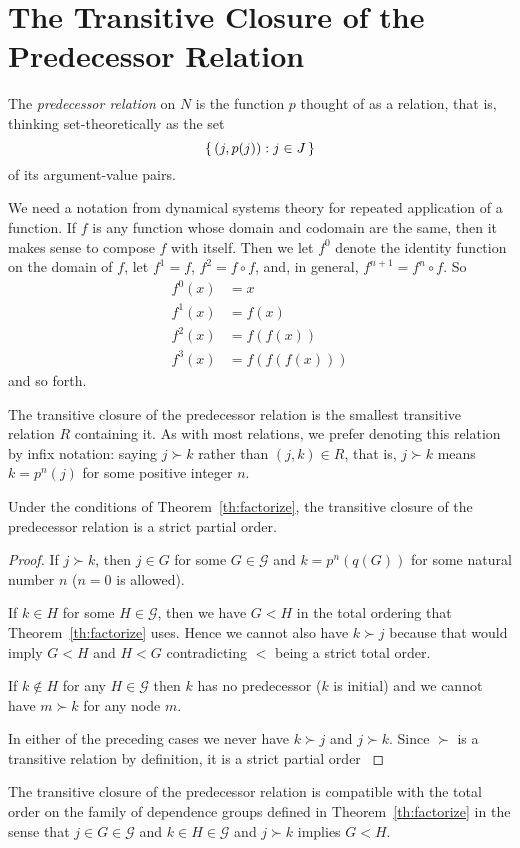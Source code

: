 \section{The Transitive Closure of the Predecessor Relation}
\label{sec:closure}

The \emph{predecessor relation} on $N$ is the function $p$ thought
of as a relation, that is, thinking set-theoretically
\citep[Section~7]{halmos-set-theory} as the set
$$
   \{\,  (j, p(j)) : j \in J  \,\}
$$
of its argument-value pairs.

We need a notation from dynamical systems theory for repeated application
of a function.  If $f$ is any function whose domain and codomain are the same,
then it makes sense to compose $f$ with itself.  Then we let $f^0$ denote
the identity function on the domain of $f$, let $f^1 = f$, $f^2 = f \circ f$,
and, in general, $f^{n + 1} = f^n \circ f$.
So
\begin{align*}
   f^0(x) & = x
   \\
   f^1(x) & = f(x)
   \\
   f^2(x) & = f(f(x))
   \\
   f^3(x) & = f(f(f(x)))
\end{align*}
and so forth.

The transitive closure of the predecessor relation
is the smallest transitive relation $R$ containing it.
As with most relations, we prefer denoting this relation by infix notation:
saying $j \succ k$ rather than $(j, k) \in R$, that is, $j \succ k$ means
$k = p^n(j)$ for some positive integer $n$.

\begin{theorem} \label{th:transitive-closure}
Under the conditions of Theorem~\ref{th:factorize},
the transitive closure of the predecessor relation is a strict partial order.
\end{theorem}
\begin{proof}
If $j \succ k$, then $j \in G$ for some $G \in \mathcal{G}$ and
$k = p^n(q(G))$ for some natural number $n$ ($n = 0$ is allowed).

If $k \in H$ for some $H \in \mathcal{G}$,
then we have $G < H$ in the total ordering
that Theorem~\ref{th:factorize} uses.
Hence we cannot also have $k \succ j$ because that would imply $G < H$
and $H < G$ contradicting $<$ being a strict total order.

If $k \notin H$ for any $H \in \mathcal{G}$ then $k$ has no predecessor
($k$ is initial) and we cannot have $m \succ k$ for any node $m$.

In either of the preceding cases we never have $k \succ j$ and $j \succ k$.
Since $\succ$ is a transitive relation by definition, it is
a strict partial order \citep[Section~14]{halmos-set-theory}
\end{proof}
\begin{corollary} \label{cor:compatible}
The transitive closure of the predecessor relation is compatible with
the total order on the family of dependence groups defined
in Theorem~\ref{th:factorize} in the sense that
$j \in G \in \mathcal{G}$ and $k \in H \in \mathcal{G}$ and $j \succ k$
implies $G < H$.
\end{corollary}


